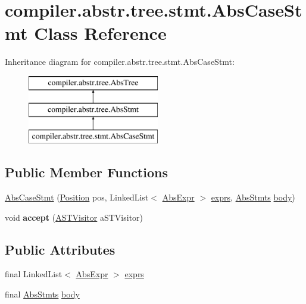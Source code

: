 \hypertarget{classcompiler_1_1abstr_1_1tree_1_1stmt_1_1_abs_case_stmt}{}\section{compiler.\+abstr.\+tree.\+stmt.\+Abs\+Case\+Stmt Class Reference}
\label{classcompiler_1_1abstr_1_1tree_1_1stmt_1_1_abs_case_stmt}
Inheritance diagram for compiler.\+abstr.\+tree.\+stmt.\+Abs\+Case\+Stmt\+:\begin{figure}[H]
\begin{center}
\leavevmode
\includegraphics[height=3.000000cm]{classcompiler_1_1abstr_1_1tree_1_1stmt_1_1_abs_case_stmt}
\end{center}
\end{figure}
\subsection*{Public Member Functions}
\begin{DoxyCompactItemize}
\item 
\hyperlink{classcompiler_1_1abstr_1_1tree_1_1stmt_1_1_abs_case_stmt_aea00a14182b44b764f9d4eed67c69094}{Abs\+Case\+Stmt} (\hyperlink{classcompiler_1_1_position}{Position} pos, Linked\+List$<$ \hyperlink{classcompiler_1_1abstr_1_1tree_1_1expr_1_1_abs_expr}{Abs\+Expr} $>$ \hyperlink{classcompiler_1_1abstr_1_1tree_1_1stmt_1_1_abs_case_stmt_a3fd4efb25dcdc2e9cf82ce9a3227b9d9}{exprs}, \hyperlink{classcompiler_1_1abstr_1_1tree_1_1_abs_stmts}{Abs\+Stmts} \hyperlink{classcompiler_1_1abstr_1_1tree_1_1stmt_1_1_abs_case_stmt_acf394ef22ceec4ec4ca843188d71fd30}{body})
\item 
\mbox{\label{classcompiler_1_1abstr_1_1tree_1_1stmt_1_1_abs_case_stmt_a3c789f2217175c2c37c9ddcd2004912c}} 
void {\bfseries accept} (\hyperlink{interfacecompiler_1_1abstr_1_1_a_s_t_visitor}{A\+S\+T\+Visitor} a\+S\+T\+Visitor)
\end{DoxyCompactItemize}
\subsection*{Public Attributes}
\begin{DoxyCompactItemize}
\item 
final Linked\+List$<$ \hyperlink{classcompiler_1_1abstr_1_1tree_1_1expr_1_1_abs_expr}{Abs\+Expr} $>$ \hyperlink{classcompiler_1_1abstr_1_1tree_1_1stmt_1_1_abs_case_stmt_a3fd4efb25dcdc2e9cf82ce9a3227b9d9}{exprs}
\item 
final \hyperlink{classcompiler_1_1abstr_1_1tree_1_1_abs_stmts}{Abs\+Stmts} \hyperlink{classcompiler_1_1abstr_1_1tree_1_1stmt_1_1_abs_case_stmt_acf394ef22ceec4ec4ca843188d71fd30}{body}
\end{DoxyCompactItemize}


